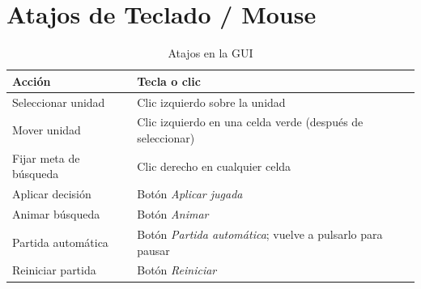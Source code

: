 \section{Atajos de Teclado / Mouse}
\label{sec:atajos}

\begin{table}[H]
\centering
\caption{Atajos en la GUI}
\begin{tabular}{ll}
\toprule
\textbf{Acción} & \textbf{Tecla o clic} \\
\midrule
Seleccionar unidad & Clic izquierdo sobre la unidad \\
Mover unidad & Clic izquierdo en una celda verde (después de seleccionar) \\
Fijar meta de búsqueda & Clic derecho en cualquier celda \\
Aplicar decisión & Botón \textit{Aplicar jugada} \\
Animar búsqueda & Botón \textit{Animar} \\
Partida automática & Botón \textit{Partida automática}; vuelve a pulsarlo para pausar \\
Reiniciar partida & Botón \textit{Reiniciar} \\
\bottomrule
\end{tabular}
\end{table}